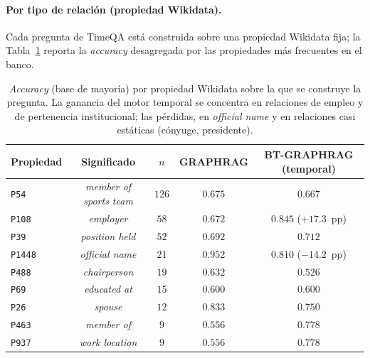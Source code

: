 \paragraph{Por tipo de relación (propiedad Wikidata).} Cada pregunta de TimeQA está construida sobre una propiedad Wikidata fija; la Tabla~\ref{tab:eval-timeqa-by-property} reporta la \emph{accuracy} desagregada por las propiedades más frecuentes en el banco.

\begin{table}[h]
\centering
\small
\begin{tabular}{lcccc}
\hline
\textbf{Propiedad} & \textbf{Significado} & \textbf{$n$} & \textbf{GRAPHRAG} & \textbf{BT-GRAPHRAG (temporal)} \\ \hline
\texttt{P54}   & \emph{member of sports team}     & $126$ & $0.675$ & $0.667$ \\
\texttt{P108}  & \emph{employer}                  & $58$  & $0.672$ & $\mathbf{0.845}$ \quad ($+17.3$~pp) \\
\texttt{P39}   & \emph{position held}             & $52$  & $0.692$ & $0.712$ \\
\texttt{P1448} & \emph{official name}             & $21$  & $\mathbf{0.952}$ & $0.810$ \quad ($-14.2$~pp) \\
\texttt{P488}  & \emph{chairperson}               & $19$  & $0.632$ & $0.526$ \\
\texttt{P69}   & \emph{educated at}               & $15$  & $0.600$ & $0.600$ \\
\texttt{P26}   & \emph{spouse}                    & $12$  & $0.833$ & $0.750$ \\
\texttt{P463}  & \emph{member of}                 & $9$   & $0.556$ & $\mathbf{0.778}$ \\
\texttt{P937}  & \emph{work location}             & $9$   & $0.556$ & $\mathbf{0.778}$ \\ \hline
\end{tabular}
\caption{\emph{Accuracy} (base de mayoría) por propiedad Wikidata sobre la que se construye la pregunta. La ganancia del motor temporal se concentra en relaciones de empleo y de pertenencia institucional; las pérdidas, en \emph{official name} y en relaciones casi estáticas (cónyuge, presidente).}
\label{tab:eval-timeqa-by-property}
\end{table}

